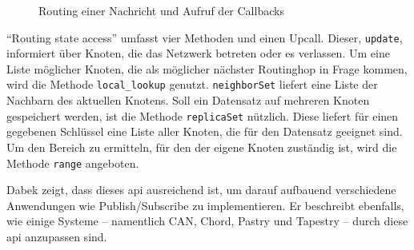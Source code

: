 \begin{figure}[htbp]
\centering
{}
\caption{Routing einer Nachricht und Aufruf der Callbacks}
\label{fig:routing_kbr}
\end{figure}


\enquote{Routing state access} umfasst vier Methoden und einen Upcall. Dieser, \texttt{update}, informiert über Knoten, die das Netzwerk betreten oder es verlassen. Um eine Liste möglicher Knoten, die als möglicher nächster Routinghop in Frage kommen, wird die Methode \texttt{local\_lookup} genutzt. \texttt{neighborSet} liefert eine Liste der Nachbarn des aktuellen Knotens. Soll ein Datensatz auf mehreren Knoten gespeichert werden, ist die Methode \texttt{replicaSet} nützlich. Diese liefert für einen gegebenen Schlüssel eine Liste aller Knoten, die für den Datensatz geeignet sind. Um den Bereich zu ermitteln, für den der eigene Knoten zuständig ist, wird die Methode \texttt{range} angeboten.

Dabek zeigt, dass dieses \acf{api} ausreichend ist, um darauf aufbauend verschiedene Anwendungen wie Publish/Subscribe zu implementieren. Er beschreibt ebenfalls, wie einige Systeme -- namentlich CAN, Chord, Pastry und Tapestry -- durch diese \ac{api} anzupassen sind.
